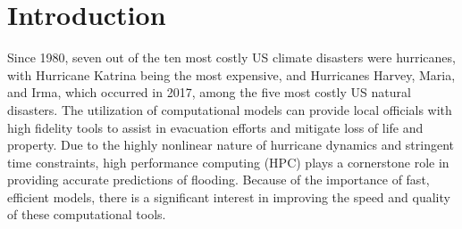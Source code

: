 \chapter{Introduction}%

Since 1980, seven out of the ten most costly US climate disasters were hurricanes, with Hurricane Katrina being the most expensive\cite{NCEI2018}, and Hurricanes Harvey, Maria, and Irma, which occurred in 2017, among the five most costly US natural disasters.
The utilization of computational models can provide local officials with high fidelity tools to assist in evacuation efforts and mitigate loss of life and property.
Due to the highly nonlinear nature of hurricane dynamics and stringent time constraints, high performance computing (HPC) plays a cornerstone role in providing accurate predictions of flooding.
Because of the importance of fast, efficient models, there is a significant interest in improving the speed and quality of these computational tools.

